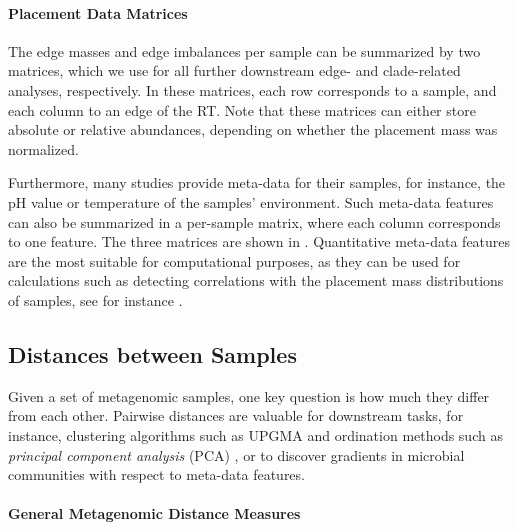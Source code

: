 \paragraph{Placement Data Matrices}
\label{ch:Foundations:sec:PhylogeneticPlacement:sub:PlacementProcessing:par:PlacementDataMatrices}

The edge masses and edge imbalances per sample can be summarized by two matrices,
which we use for all further downstream edge- and clade-related analyses, respectively.
In these matrices, each row corresponds to a sample, and each column to an edge of the \ac{RT}.
Note that these matrices can either store absolute or relative abundances,
depending on whether the placement mass was normalized.

Furthermore, many studies provide meta-data for their samples,
for instance, the pH value or temperature of the samples' environment.
Such meta-data features can also be summarized in a per-sample matrix, where each column corresponds to one feature.
The three matrices are shown in .
Quantitative meta-data features are the most suitable for computational purposes,
as they can be used for calculations such as detecting correlations with the placement mass distributions of samples,
see for instance .


\subsection{Distances between Samples}
\label{ch:Foundations:sec:PhylogeneticPlacement:sub:Distances}

Given a set of metagenomic samples, one key question is how much they differ from each other.
Pairwise distances are valuable for downstream tasks, for instance,
clustering algorithms such as \mbox{UPGMA} \cite{Michener1957,Sokal1958,Legendre1998} and
ordination methods such as \emph{principal component analysis} (PCA) \cite{Pearson1901,Jolliffe2002},
or to discover gradients in microbial communities with respect to meta-data features.

\paragraph{General Metagenomic Distance Measures}
\label{ch:Foundations:sec:PhylogeneticPlacement:sub:Distances:par:GeneralMeasures}

